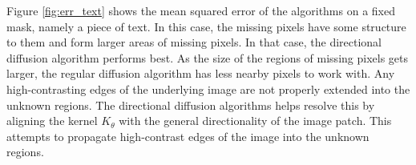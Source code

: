 Figure \ref{fig:err_text} shows the mean squared error of the algorithms on a fixed mask, namely a piece of text. In this case, the missing pixels have some structure to them and form larger areas of missing pixels. In that case, the directional diffusion algorithm performs best. As the size of the regions of missing pixels gets larger, the regular diffusion algorithm has less nearby pixels to work with. Any high-contrasting edges of the underlying image are not properly extended into the unknown regions. The directional diffusion algorithms helps resolve this by aligning the kernel  $K_{\theta}$ with the general directionality of the image patch. This attempts to propagate high-contrast edges of the image into the unknown regions.


\begin{figure}
		
\end{figure}